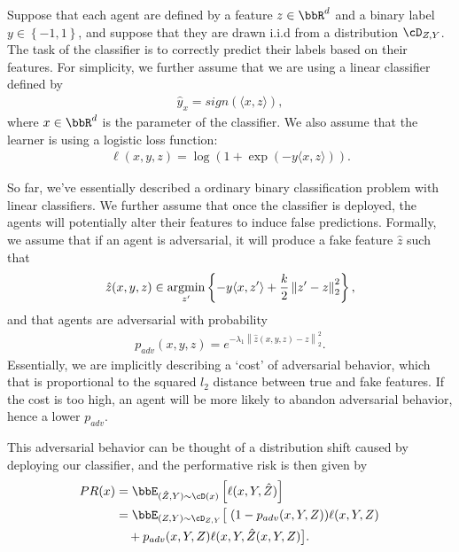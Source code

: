 Suppose that each agent are defined by a feature $z \in \bbR^d$ and a binary label $y \in \left\{ -1, 1 \right\}$, and
suppose that they are drawn i.i.d from a distribution $\cD_{Z, Y}$.
The task of the classifier is to correctly predict their
labels based on their features.
For simplicity, we further assume that
we are using a linear classifier defined by
\[
\begin{aligned}
    \hat{y}_{x}
    =
    sign(\langle x, z\rangle),
\end{aligned}
\]
where $x \in \bbR^d$ is the parameter of the classifier.
We also assume that the learner is using a logistic loss function:
\[
\begin{aligned}
    \ell(x, y, z)
    =
    \log(1 + \exp(-y\langle x, z\rangle)).
\end{aligned}
\]

So far, we've essentially described a ordinary binary classification problem with linear classifiers.
We further assume that once the classifier is deployed,
the agents will potentially alter their features to
induce false predictions.
Formally, we assume that if an agent is adversarial,
it will produce a fake feature $\hat{z}$ such that
\[
\begin{aligned}
    \hat{z}(x, y, z)
    \in
    \operatorname*{argmin}_{z'}
    \left\{
        -y\langle x,z'\rangle
        +
        \frac{k}{2}
        \left\|z' - z\right\|_2^2
    \right\},
\end{aligned}
\]
and that agents are adversarial with probability
\[
\begin{aligned}
    p_{adv}(x, y, z)
    =
    e^{-\lambda_1 \left\|\hat{z}(x, y, z) - z\right\|_2^2}.
\end{aligned}
\]
Essentially, we are implicitly describing a `cost'
of adversarial behavior, which
that is proportional to the squared $l_2$ distance
between true and fake features. If the cost is too high,
an agent will be more likely to abandon adversarial
behavior, hence a lower $p_{adv}$.


This adversarial behavior can be thought of a distribution
shift caused by deploying our classifier, and the performative
risk is then given by
\begin{align*}
    PR(x)
    &=
    \bbE_{(\hat{Z}, Y) \sim \cD(x)}
    \left[ \ell(x, Y, \hat{Z}) \right] \\
    &=
    \bbE_{(Z, Y)\sim\cD_{Z, Y}}
    \big[
        \left.(1 - p_{adv}(x, Y, Z))
        \ell(x, Y, Z) \right.\\
        &\quad+
        p_{adv}(x, Y, Z)
        \ell(x, Y, \hat{Z}(x, Y, Z)
    \big].
\end{align*}


